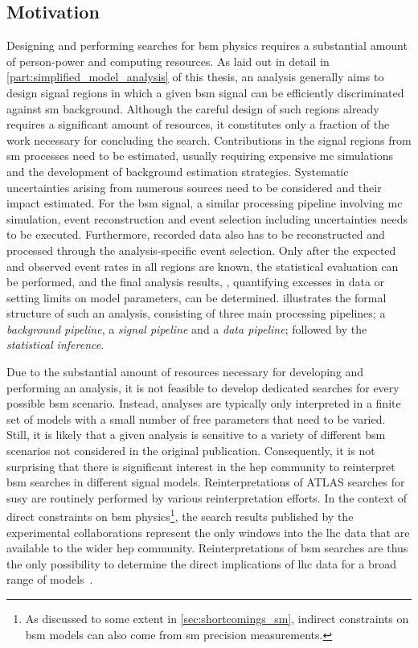 \subsection{Motivation}
Designing and performing searches for \gls{bsm} physics requires a substantial amount of person-power and computing resources. As laid out in detail in \cref{part:simplified_model_analysis} of this thesis, an analysis generally aims to design signal regions in which a given \gls{bsm} signal can be efficiently discriminated against \gls{sm} background. Although the careful design of such regions already requires a significant amount of resources, it constitutes only a fraction of the work necessary for concluding the search. 
Contributions in the signal regions from \gls{sm} processes need to be estimated, usually requiring expensive \gls{mc} simulations and the development of background estimation strategies. Systematic uncertainties arising from numerous sources need to be considered and their impact estimated. 
For the \gls{bsm} signal, a similar processing pipeline involving \gls{mc} simulation, event reconstruction and event selection including uncertainties needs to be executed.
Furthermore, recorded data also has to be reconstructed and processed through the analysis-specific event selection.
Only after the expected and observed event rates in all regions are known, the statistical evaluation can be performed, and the final analysis results, \eg, quantifying excesses in data or setting limits on model parameters, can be determined.
 illustrates the formal structure of such an analysis, consisting of three main processing pipelines; a \textit{background pipeline}, a \textit{signal pipeline} and a \textit{data pipeline}; followed by the \textit{statistical inference}.

Due to the substantial amount of resources necessary for developing and performing an analysis, it is not feasible to develop dedicated searches for every possible \gls{bsm} scenario.
Instead, analyses are typically only interpreted in a finite set of models with a small number of free parameters that need to be varied.
Still, it is likely that a given analysis is sensitive to a variety of different \gls{bsm} scenarios not considered in the original publication. 
Consequently, it is not surprising that there is significant interest in the \gls{hep} community to reinterpret \gls{bsm} searches in different signal models. Reinterpretations of ATLAS searches for \gls{susy} are routinely performed by various reinterpretation efforts.
In the context of direct constraints on \gls{bsm} physics\footnote{As discussed to some extent in \cref{sec:shortcomings_sm}, indirect constraints on \gls{bsm} models can also come from \gls{sm} precision measurements.}, the search results published by the experimental collaborations represent the only windows into the \gls{lhc} data that are available to the wider \gls{hep} community.
Reinterpretations of \gls{bsm} searches are thus the only possibility to determine the direct implications of \gls{lhc} data for a broad range of models~\cite{reinterpretation_workshop}.

